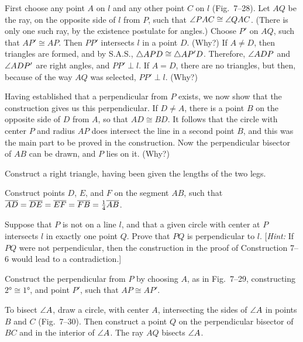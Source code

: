 \documentclass[11pt]{book}
\begin{document}
First choose any point $A$ on $l$ and any other point $C$ on $l$ (Fig.~7--28).
Let $AQ$ be the ray, on the opposite side of $l$ from $P$, such that
$\angle PAC \cong \angle QAC$. (There is only one such ray, by the existence
postulate for angles.) Choose $P'$ on $AQ$, such that $AP' \cong AP$. Then
$PP'$ intersects $l$ in a point $D$. (Why?) If $A \neq D$, then triangles are
formed, and by S.A.S., $\triangle APD \cong \triangle AP'D$. Therefore, $\angle ADP$ and
$\angle ADP'$ are right angles, and $PP' \perp l$. If $A = D$, there are no
triangles, but then, because of the way $AQ$ was selected, $PP' \perp l$.
(Why?)

Having established that a perpendicular from $P$ exists, we now show that the
\RC{} construction gives us this perpendicular. If $D \neq A$, there is a point
$B$ on the opposite side of $D$ from $A$, so that $AD \cong BD$. It follows
that the circle with center $P$ and radius $AP$ does intersect the line in a
second point $B$, and this was the main part to be proved in the construction.
Now the perpendicular bisector of $AB$ can be drawn, and $P$ lies on it.
(Why?)

\begin{exercisecols}
\begin{exlist}
\item Construct a right triangle, having been given the lengths of the two
  legs.
\item Construct points $D$, $E$, and $F$ on the segment $AB$, such that
  $\overline{AD} = \overline{DE} = \overline{EF} = \overline{FB} = \frac{1}{4}\overline{AB}$.
\item[\stex 3.] Suppose that $P$ is not on a line $l$, and that a given circle
  with center at $P$ intersects $l$ in exactly one point $Q$. Prove that $PQ$
  is perpendicular to $l$. [\emph{Hint:} If $PQ$ were not perpendicular, then
  the construction in the proof of Construction 7--6 would lead to a
  contradiction.]
\item Construct the perpendicular from $P$ by choosing $A$, as in Fig.~7--29,
  constructing $\ang{2} \cong \ang{1}$, and point $P'$, such that
  $AP \cong AP'$.
\exfig{\FIGVIITWENTYNINE}
\end{exlist}
\end{exercisecols}

\begin{construction}
To bisect $\angle A$, draw a circle, with center $A$, intersecting the sides of
$\angle A$ in points $B$ and $C$ (Fig.~7--30). Then construct a point $Q$ on the
perpendicular bisector of $BC$ and in the interior of $\angle A$. The ray $AQ$
bisects $\angle A$.
\end{construction}
\end{document}
